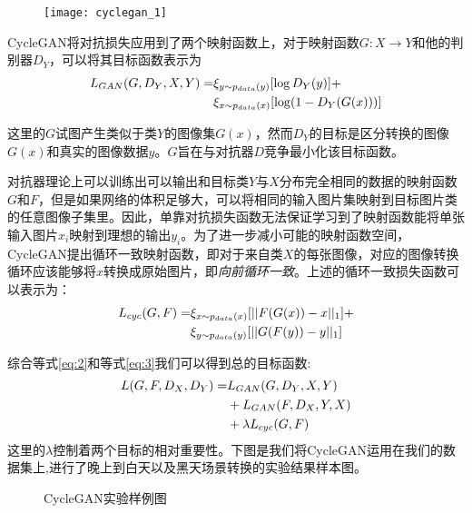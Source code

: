 \begin{figure}[h]
    \centering
    \texttt{[image: cyclegan\_1]}
    \label{cyclegan_1}
    \caption{}
\end{figure}

CycleGAN将对抗损失应用到了两个映射函数上，对于映射函数$G:X\to Y$和他的判别器$D_Y$，可以将其目标函数表示为
\begin{align*}
    \label{eq:2}
    \centering
    L_{GAN}(G,D_Y,X,Y)= & \xi_{y\sim p_{data}(y)}[\log D_Y(y)] + \\
    & \xi_{x\sim p_{data}(x)}[\log (1-D_Y(G(x)))]
\end{align*}

这里的$G$试图产生类似于类$Y$的图像集$G(x)$，然而$D_Y$的目标是区分转换的图像$G(x)$和真实的图像数据$y$。$G$旨在与对抗器$D$竞争最小化该目标函数。

对抗器理论上可以训练出可以输出和目标类$Y$与$X$分布完全相同的数据的映射函数$G$和$F$，但是如果网络的体积足够大，可以将相同的输入图片集映射到目标图片类的任意图像子集里。因此，单靠对抗损失函数无法保证学习到了映射函数能将单张输入图片$x_i$映射到理想的输出$y_i$。为了进一步减小可能的映射函数空间，CycleGAN提出循环一致映射函数，即对于来自类$X$的每张图像，对应的图像转换循环应该能够将$x$转换成原始图片，即\textit{向前循环一致}。上述的循环一致损失函数可以表示为：
\begin{align*}
    \label{eq:3}
    \centering
    L_{cyc}(G,F)= & \xi_{x\sim p_{data}(x)}[||F(G(x))-x||_1] + \\
    & \xi_{y\sim p_{data}(y)}[||G(F(y))-y||_1]
\end{align*}

综合等式\ref{eq:2}和等式\ref{eq:3}我们可以得到总的目标函数:
\begin{align*}
    \centering
    L(G, F, D_X, D_Y) = & L_{GAN}(G,D_Y, X, Y) \\
    & + L_{GAN}(F,D_X, Y, X) \\
    & + \lambda L_{cyc}(G, F)
\end{align*}
这里的$\lambda$控制着两个目标的相对重要性。下图是我们将CycleGAN运用在我们的数据集上,进行了晚上到白天以及黑天场景转换的实验结果样本图。

\begin{figure}[h]
    \centering
    \caption{CycleGAN实验样例图}
\end{figure}

